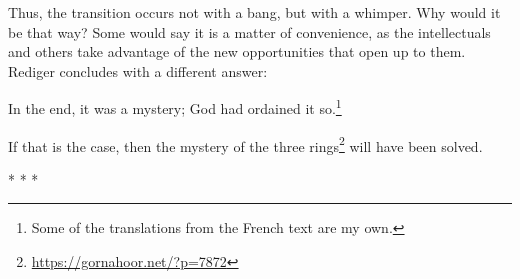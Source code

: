 Thus, the transition occurs not with a bang, but with a whimper. Why would it be that way? Some would say it is a matter of convenience, as the intellectuals and others take advantage of the new opportunities that open up to them. Rediger concludes with a different answer:

\begin{quotex}
In the end, it was a mystery; God had ordained it so.\footnote{Some of the translations from the French text are my own.}
\end{quotex}


If that is the case, then the mystery of the three rings\footnote{\url{https://gornahoor.net/?p=7872}} will have been solved.


\begin{center}* * *\end{center}

